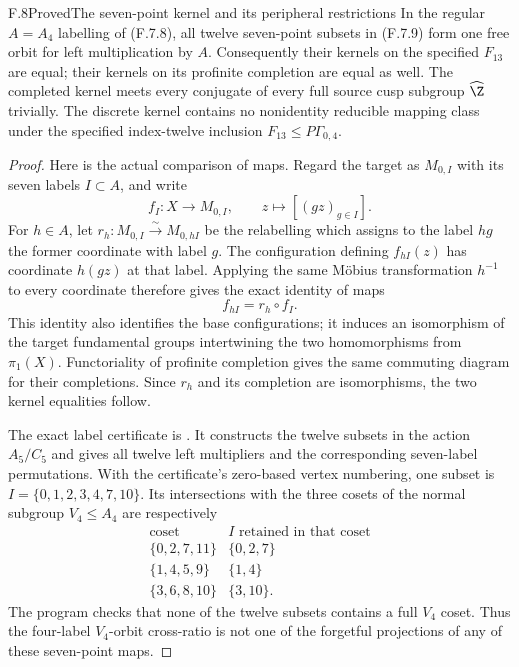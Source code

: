 \begin{claim}{F.8}{Proved}{The seven-point kernel and its peripheral restrictions}
In the regular $A=A_4$ labelling of (F.7.8), all twelve
seven-point subsets in (F.7.9) form one free orbit for
left multiplication by $A$.  Consequently their kernels
on the specified $F_{13}$ are equal; their kernels on
its profinite completion are equal as well.
The completed kernel meets every conjugate of every
full source cusp subgroup $\widehat\Z$ trivially.
The discrete kernel contains no nonidentity reducible
mapping class under the specified index-twelve
inclusion $F_{13}\le P\Gamma_{0,4}$.
\end{claim}
\begin{proof}

Here is the actual comparison of maps.  Regard the target
as $M_{0,I}$ with its seven labels $I\subset A$, and write
\[
 f_I:X\longrightarrow M_{0,I},\qquad
             z\longmapsto[(gz)_{g\in I}].
\]
For $h\in A$, let
$r_h:M_{0,I}\xrightarrow{\sim}M_{0,hI}$ be the relabelling
which assigns to the label $hg$ the former coordinate
with label $g$.  The configuration defining $f_{hI}(z)$
has coordinate $h(gz)$ at that label.  Applying the same
M\"obius transformation $h^{-1}$ to every coordinate
therefore gives the exact identity of maps
\[
                         f_{hI}=r_h\circ f_I.
\]
This identity also identifies the base configurations;
it induces an isomorphism of the target fundamental
groups intertwining the two homomorphisms from
$\pi_1(X)$.  Functoriality of profinite completion gives
the same commuting diagram for their completions.
Since $r_h$ and its completion are isomorphisms, the
two kernel equalities follow.

The exact label certificate is
.
It constructs the twelve subsets in the action
$A_5/C_5$ and gives all twelve left multipliers and
the corresponding seven-label permutations.  With
the certificate's zero-based vertex numbering, one
subset is $I=\{0,1,2,3,4,7,10\}$.  Its intersections
with the three cosets of the normal subgroup
$V_4\le A_4$ are respectively
\[
 \begin{array}{c|c}
 \text{coset}&I\text{ retained in that coset}\\ \hline
 \{0,2,7,11\}&\{0,2,7\}\\
 \{1,4,5,9\}&\{1,4\}\\
 \{3,6,8,10\}&\{3,10\}.
 \end{array}
\]
The program checks that none of the twelve subsets
contains a full $V_4$ coset.  Thus the four-label
$V_4$-orbit cross-ratio is not one of the forgetful
projections of any of these seven-point maps.


\end{proof}
